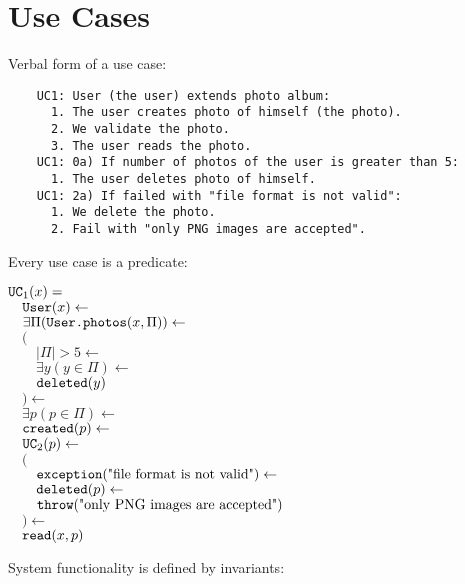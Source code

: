 \documentclass{article}
\begin{document}
\newpage
\section{Use Cases}

    Verbal form of a use case:
    
    \begin{verbatim}
    UC1: User (the user) extends photo album:
      1. The user creates photo of himself (the photo).
      2. We validate the photo.
      3. The user reads the photo.
    UC1: 0a) If number of photos of the user is greater than 5:
      1. The user deletes photo of himself.
    UC1: 2a) If failed with "file format is not valid":
      1. We delete the photo.
      2. Fail with "only PNG images are accepted".\end{verbatim}

    Every use case is a predicate:
    
    \begin{maths}
    $\mbox{\texttt{UC}}_1(x) = $ \\
    $\quad \mbox{\texttt{User}}(x) \leftarrow$ \\
    $\quad \exists \Pi(\mbox{\texttt{User.photos}}(x, \Pi)) \leftarrow$ \\
    $\quad ($ \\
    $\quad\quad |\Pi| > 5 \leftarrow$ \\
    $\quad\quad \exists y(y \in \Pi) \leftarrow$ \\
    $\quad\quad \mbox{\texttt{deleted}}(y)$ \\
    $\quad ) \leftarrow$ \\
    $\quad \exists p(p \in \Pi) \leftarrow$ \\
    $\quad \mbox{\texttt{created}}(p) \leftarrow$ \\
    $\quad \mbox{\texttt{UC}}_2(p) \leftarrow$ \\
    $\quad ($ \\
    $\quad\quad \mbox{\texttt{exception}}(\mbox{"file format is not valid"}) \leftarrow$ \\
    $\quad\quad \mbox{\texttt{deleted}}(p) \leftarrow$ \\
    $\quad\quad \mbox{\texttt{throw}}(\mbox{"only PNG images are accepted"})$ \\
    $\quad ) \leftarrow$ \\
    $\quad \mbox{\texttt{read}}(x, p)$ \\
    \end{maths}
    
    System functionality is defined by invariants:
\end{document}
